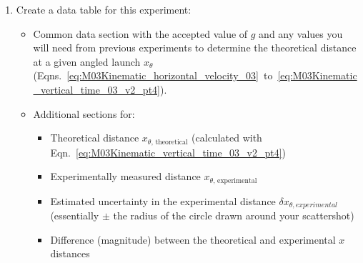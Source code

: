 \begin{enumerate}
\item Create a data table for this experiment:
\begin{itemize}
    \item Common data section with the accepted value of $g$ and any values you will need from previous experiments to determine the theoretical distance at a given angled launch $x_{\theta}$ (Eqns.~\ref{eq:M03Kinematic_horizontal_velocity_03}~to~\ref{eq:M03Kinematic_vertical_time_03_v2_pt4}).
    \item Additional sections for:
    \begin{itemize}

    
        \item Theoretical distance $x_{\theta\text{, theoretical}}$ (calculated with Eqn.~\ref{eq:M03Kinematic_vertical_time_03_v2_pt4})
        \item Experimentally measured distance $x_{\theta\text{, experimental}}$
        \item Estimated uncertainty in the experimental distance $\delta x_{\theta, experimental}$ (essentially $\pm$ the radius of the circle drawn around your scattershot)
        \item Difference (magnitude) between the theoretical and experimental $x$ distances
    \end{itemize}
\end{itemize}


\end{enumerate}
